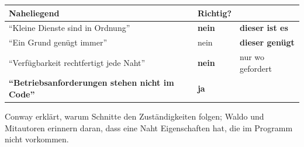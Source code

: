 \begin{warnung}
\begin{center}
\renewcommand{\arraystretch}{1.5}
\begin{tabular}{@{}P{3.2cm}P{2.2cm}P{2.4cm}@{}}
\toprule
\textbf{Naheliegend} & \textbf{Richtig?} & \\
\midrule
\enquote{Kleine Dienste sind in Ordnung} & \textcolor{akzent}{\textbf{nein}} & \textcolor{akzent}{\textbf{dieser ist es}}\\
\enquote{Ein Grund genügt immer} & \textcolor{akzent}{nein} & \textbf{dieser genügt}\\
\enquote{Verfügbarkeit rechtfertigt jede Naht} & \textcolor{akzent}{\textbf{nein}} & \textcolor{akzent}{nur wo gefordert}\\
\textbf{\enquote{Betriebsanforderungen stehen nicht im Code}} & \textcolor{gruen}{\textbf{ja}} & \\
\bottomrule
\end{tabular}
\end{center}

\begin{center}
\begin{minipage}{0.88\textwidth}
\end{minipage}
\end{center}

\begin{center}
\end{center}
\end{warnung}
\vspace{-4pt}
\noindent Conway erklärt, warum Schnit\-te den Zu\-stän\-dig\-kei\-ten folgen; Waldo und Mit\-au\-to\-ren erinnern daran, dass eine Naht Ei\-gen\-schaf\-ten hat, die im Pro\-gramm nicht vorkommen.
